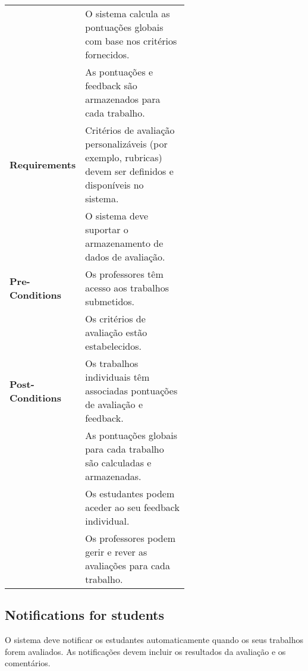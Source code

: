 \documentclass[10pt]{article}
\begin{document}
\begin{table}[H]
\begin{tabular}{|l|p{0.6\linewidth}|}
        & O sistema calcula as pontuações globais com base nos critérios fornecidos. \\
        & As pontuações e feedback são armazenados para cada trabalho. \\
        \hline
        \textbf{Requirements} & Critérios de avaliação personalizáveis (por exemplo, rubricas) devem ser definidos e 
        disponíveis no sistema. \\
        & O sistema deve suportar o armazenamento de dados de avaliação. \\
        \hline
        \textbf{Pre-Conditions} & Os professores têm acesso aos trabalhos submetidos. \\
        & Os critérios de avaliação estão estabelecidos. \\
        \hline
        \textbf{Post-Conditions} & Os trabalhos individuais têm associadas pontuações de avaliação e feedback. \\
        & As pontuações globais para cada trabalho são calculadas e armazenadas. \\
        & Os estudantes podem aceder ao seu feedback individual. \\
        & Os professores podem gerir e rever as avaliações para cada trabalho. \\
        \hline
    \end{tabular}
\end{table}

\newpage

\subsection{Notifications for students}
O sistema deve notificar os estudantes automaticamente quando os seus trabalhos forem avaliados. 
As notificações devem incluir os resultados da avaliação e os comentários. 
\end{document}
